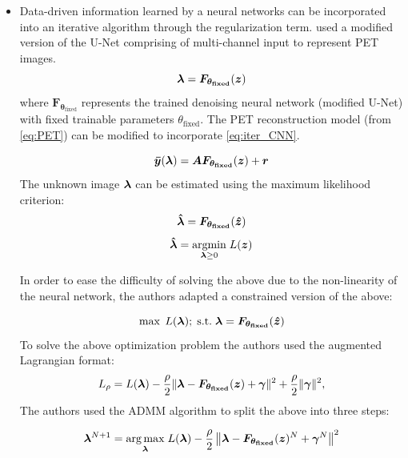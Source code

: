 \begin{itemize}


\item Data-driven information learned by a neural networks can be incorporated into an iterative algorithm through the regularization term. \cite{gong2019iterative} used a modified version of the U-Net comprising of multi-channel input to represent \ac{PET} images.
\begin{equation}\label{eq:iter_CNN}
\bm{\lambda} = \bm{F}_{\bm{\theta_{\mathrm{fixed}}}}(\bm{z})
\end{equation} 
where $\bm{F}_{\bm{\theta_{\mathrm{fixed}}}}$ represents the trained denoising neural network (modified U-Net) with fixed trainable parameters $\theta_{\mathrm{fixed}}$. The \ac{PET} reconstruction model (from \ref{eq:PET}) can be modified to incorporate \ref{eq:iter_CNN}. 

\begin{equation}\label{eq:mod_PET}
	\bm{\bar{y}}(\bm{\lambda}) = \bm{A} \bm{F}_{\bm{\theta_{\mathrm{fixed}}}}(\bm{z}) + \bm{r}
\end{equation}
The unknown image $\bm{\lambda}$ can be estimated using the maximum likelihood criterion:
\begin{equation}\label{eq:iter_CNN2}
\bm{\hat{\lambda}} = \bm{F}_{\bm{\theta_{\mathrm{fixed}}}}(\bm{\hat{z}})
\end{equation} 
\begin{equation}
\bm{\hat{\lambda}}=\underset{\bm{\lambda} \ge 0}{\operatorname{argmin}} \; L(\bm{z})
\end{equation}

In order to ease the difficulty of solving the above due to the non-linearity of the neural network, the authors adapted a constrained version of the above:

\begin{equation}\label{constr}
 	\operatorname{max} \; L(\bm{\bm{\lambda}});  \; \mathrm{s.t.} \; \bm{\lambda} = \bm{F}_{\bm{\theta_{\mathrm{fixed}}}}(\bm{\hat{z}})
\end{equation}
To solve the above optimization problem the authors used the augmented Lagrangian format:
\begin{equation}
L_{\rho}=L(\bm{\lambda})-\frac{\rho}{2}\|\bm{\lambda}-\bm{F}_{\bm{\theta_{\mathrm{fixed}}}}(\bm{z})+\bm{\gamma}\|^{2}+\frac{\rho}{2}\|\bm{\gamma}\|^{2},
\end{equation}
The authors used the \ac{ADMM} algorithm to split the above into three steps:

\begin{equation}\label{eq:ad1}
\bm{\lambda}^{N+1}=\underset{\bm{\lambda}}{\arg \max} \; L(\bm{\lambda})-\frac{\rho}{2}\left\|\bm{\lambda}-\bm{F}_{\bm{\theta_{\mathrm{fixed}}}}(\bm{z})^{N}+\bm{\gamma}^{N}\right\|^{2}
\end{equation}


\end{itemize}
